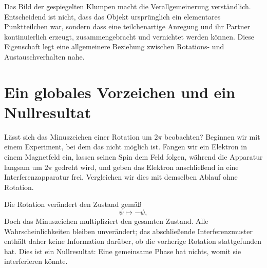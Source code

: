 \begin{classroomqa}
\end{classroomqa}

Das Bild der gespiegelten Klumpen macht die Verallgemeinerung verständlich. Entscheidend ist nicht, dass das Objekt ursprünglich ein elementares Punktteilchen war, sondern dass eine teilchenartige Anregung und ihr Partner kontinuierlich erzeugt, zusammengebracht und vernichtet werden können. Diese Eigenschaft legt eine allgemeinere Beziehung zwischen Rotations- und Austauschverhalten nahe.

\begin{classroomqa}
\end{classroomqa}

\section{Ein globales Vorzeichen und ein Nullresultat}

Lässt sich das Minuszeichen einer Rotation um \(2\pi\) beobachten? Beginnen wir mit einem Experiment, bei dem das nicht möglich ist. Fangen wir ein Elektron in einem Magnetfeld ein, lassen seinen Spin dem Feld folgen, während die Apparatur langsam um \(2\pi\) gedreht wird, und geben das Elektron anschließend in eine Interferenzapparatur frei. Vergleichen wir dies mit demselben Ablauf ohne Rotation.

Die Rotation verändert den Zustand gemäß
\begin{equation}
\psi\longmapsto-\psi,
\end{equation}
Doch das Minuszeichen multipliziert den gesamten Zustand. Alle Wahrscheinlichkeiten bleiben unverändert; das abschließende Interferenzmuster enthält daher keine Information darüber, ob die vorherige Rotation stattgefunden hat. Dies ist ein Nullresultat: Eine gemeinsame Phase hat nichts, womit sie interferieren könnte.

